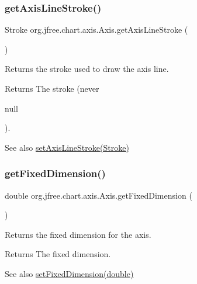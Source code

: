 \subsubsection{\texorpdfstring{get\+Axis\+Line\+Stroke()}{getAxisLineStroke()}}
{\footnotesize\ttfamily Stroke org.\+jfree.\+chart.\+axis.\+Axis.\+get\+Axis\+Line\+Stroke (\begin{DoxyParamCaption}{ }\end{DoxyParamCaption})}

Returns the stroke used to draw the axis line.

\begin{DoxyReturn}{Returns}
The stroke (never
\begin{DoxyCode}
null 
\end{DoxyCode}
 ).
\end{DoxyReturn}
\begin{DoxySeeAlso}{See also}
\mbox{\hyperlink{classorg_1_1jfree_1_1chart_1_1axis_1_1_axis_acb2ef4578aff9ebd3fff36596b86ad9a}{set\+Axis\+Line\+Stroke(\+Stroke)}} 
\end{DoxySeeAlso}
\mbox{\label{classorg_1_1jfree_1_1chart_1_1axis_1_1_axis_ae89f36379d8e1a4cd95fe6acc39de039}} 
\subsubsection{\texorpdfstring{get\+Fixed\+Dimension()}{getFixedDimension()}}
{\footnotesize\ttfamily double org.\+jfree.\+chart.\+axis.\+Axis.\+get\+Fixed\+Dimension (\begin{DoxyParamCaption}{ }\end{DoxyParamCaption})}

Returns the fixed dimension for the axis.

\begin{DoxyReturn}{Returns}
The fixed dimension.
\end{DoxyReturn}
\begin{DoxySeeAlso}{See also}
\mbox{\hyperlink{classorg_1_1jfree_1_1chart_1_1axis_1_1_axis_a1ab0c12e26c2468049d25e635988beec}{set\+Fixed\+Dimension(double)}} 
\end{DoxySeeAlso}
\mbox{\label{classorg_1_1jfree_1_1chart_1_1axis_1_1_axis_ab3cbe2900ef95b51b4036f7b753e3c41}} 
